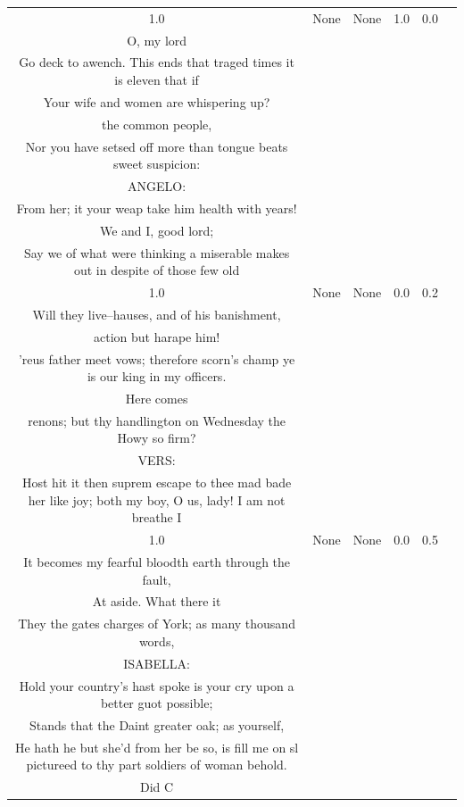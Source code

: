 \documentclass[11pt]{book}
\theoremstyle{plain}
\theoremstyle{definition}
\begin{document}
\begin{longtable}{ccccc >{\raggedright\arraybackslash}p{8cm}}
    1.0 & None & None & 1.0 & 0.0 &
    \begin{tcolorbox}[breakable, enhanced jigsaw, frame hidden, colback=white, boxrule=0pt]
    KING RICHARD:\\
    O, my lord\\
    Go deck to awench. This ends that traged times it is eleven that if\\
    Your wife and women are whispering up?\\
    the common people,\\
    Nor you have setsed off more than tongue beats sweet suspicion:\\
    ANGELO:\\
    From her; it your weap take him health with years!\\
    We and I, good lord;\\
    Say we of what were thinking a miserable makes out in despite of those few old
    \end{tcolorbox} \\
    
    1.0 & None & None & 0.0 & 0.2 &
    \begin{tcolorbox}[breakable, enhanced jigsaw, frame hidden, colback=white, boxrule=0pt]
    KING RICHARD:\\
    Will they live--hauses, and of his banishment,\\
    action but harape him!\\
    'reus father meet vows; therefore scorn's champ ye is our king in my officers.\\
    Here comes\\
    renons; but thy handlington on Wednesday the Howy so firm?\\
    VERS:\\
    Host hit it then suprem escape to thee mad bade her like joy; both my boy, O us, lady! I am not breathe I
    \end{tcolorbox} \\
    
    1.0 & None & None & 0.0 & 0.5 &
    \begin{tcolorbox}[breakable, enhanced jigsaw, frame hidden, colback=white, boxrule=0pt]
    KING RICHARD:\\
    It becomes my fearful bloodth earth through the fault,\\
    At aside. What there it\\
    They the gates charges of York; as many thousand words,\\
    ISABELLA:\\
    Hold your country's hast spoke is your cry upon a better guot possible;\\
    Stands that the Daint greater oak; as yourself,\\
    He hath he but she'd from her be so, is fill me on sl pictureed to thy part soldiers of woman behold.\\
    Did C
    \end{tcolorbox} \\
    

\end{longtable}
\end{document}
